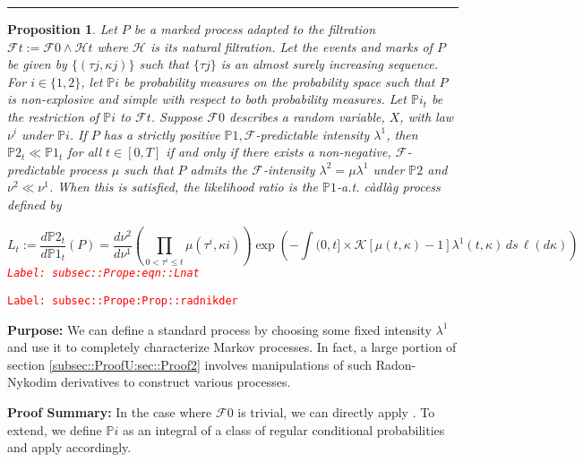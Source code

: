 \documentclass[12pt]{article}
\newcommand{\mb}{\mathbb}
\newcommand{\mc}{\mathcal}
\newcommand{\tr}{\textcolor{red}}
\newcommand{\labe}[1]{\tr{\texttt{Label: #1}}}
\newcommand{\purpose}{\textbf{Purpose: }}
\newcommand{\pfsum}{\textbf{Proof Summary: }}
\newcommand{\lin}{\rule{\linewidth}{0.4 pt}}
\newcommand{\pr}{\mb{P}}							%
\renewcommand{\t}{t}							%
\newcommand{\F}{\mc{F}}							%
\newcommand{\FH}{\mc{H}}						%
\newcommand{\rate}{\lambda}						%
\newcommand{\m}{\mu}							%
\newcommand{\mm}{\nu}							%
\newcommand{\rt}{\tau}							%
\renewcommand{\mark}{\kappa}					%
\newcommand{\rp}{P}								%
\newcommand{\mspce}{\mc{K}}						%
\newtheorem{prop}[thms]{Proposition}
\begin{document}
\lin

\begin{prop}
Let \(\rp\) be a marked process adapted to the filtration \(\F{\t} := \F{0}\wedge \FH{\t}\) where \(\FH\) is its natural filtration. Let the events and marks of \(\rp\) be given by \(\{(\rt{j},\mark{j})\}\) such that \(\{\rt{j}\}\) is an almost surely increasing sequence. For \(i \in \{1,2\}\), let \(\pr{i}\) be probability measures on the probability space such that \(\rp\) is non-explosive and simple with respect to both probability measures. Let \(\pr{i}_\t\) be the restriction of \(\pr{i}\) to \(\F{\t}\). Suppose \(\F{0}\) describes a random variable, \(X\), with law \(\mm^i\) under \(\pr{i}\). If \(\rp\) has a strictly positive \(\pr{1},\F\)-predictable intensity \(\rate^1\), then \(\pr{2}_\t \ll \pr{1}_\t\) for all \(\t \in [0,T]\) if and only if there exists a non-negative, \(\F\)-predictable process \(\m\) such that \(\rp\) admits the \(\F\)-intensity \(\rate^2 = \m\rate^1\) under \(\pr{2}\) and \(\mm^2 \ll \mm^1\). When this is satisfied, the likelihood ratio is the \(\pr{1}\)-a.t. c\`adl\`ag process defined by 

\begin{equation}
L_\t:= \frac{d\pr{2}_\t}{d\pr{1}_\t}(\rp) = \frac{d\mm^2}{d\mm^1}\left(\prod_{0<\rt^i\leq \t} \m(\rt^i,\mark{i})\right)\exp\left(-\int{(0,\t]\times \mspce}[\m(\t,\mark) - 1]\rate^1(\t,\mark)\,ds\,\ell(d\mark)\right)
\label{subsec::Prope:eqn::Lnat}
\end{equation}
\labe{subsec::Prope:eqn::Lnat}
\label{subsec::Prope:Prop::radnikder}
\end{prop}
\labe{subsec::Prope:Prop::radnikder}

\purpose We can define a standard process by choosing some fixed intensity \(\rate^1\) and use it to completely characterize Markov processes. In fact, a large portion of section \ref{subsec::ProofU:sec::Proof2} involves manipulations of such Radon-Nykodim derivatives to construct various processes.

\pfsum In the case where \(\F{0}\) is trivial, we can directly apply \cite[Theorem 14.4.I]{DalVer08}. To extend, we define \(\pr{i}\) as an integral of a class of regular conditional probabilities and apply \cite[Theorem 14.4.I]{DalVer08} accordingly.
\end{document}
